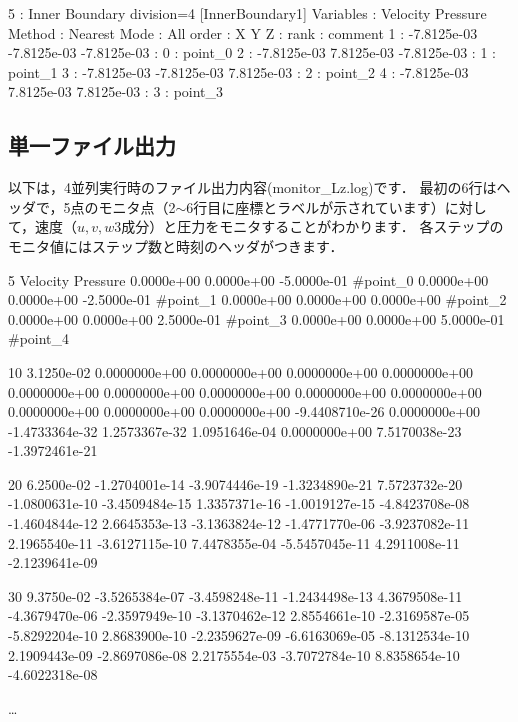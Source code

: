 {\begin{program}
  5 : Inner Boundary     division=4  [InnerBoundary1]
    Variables : Velocity Pressure 
       Method : Nearest
         Mode : All
        order :            X            Y            Z  :   rank : comment
            1 :  -7.8125e-03  -7.8125e-03  -7.8125e-03  :      0 : point_0
            2 :  -7.8125e-03   7.8125e-03  -7.8125e-03  :      1 : point_1
            3 :  -7.8125e-03  -7.8125e-03   7.8125e-03  :      2 : point_2
            4 :  -7.8125e-03   7.8125e-03   7.8125e-03  :      3 : point_3
\end{program}
}

\subsection{単一ファイル出力}
以下は，4並列実行時のファイル出力内容(monitor\_Lz.log)です．
最初の6行はヘッダで，5点のモニタ点（2$\sim$6行目に座標とラベルが示されています）に対して，速度（$u,v,w$3成分）と圧力をモニタすることがわかります．
各ステップのモニタ値にはステップ数と時刻のヘッダがつきます．

{\small
\begin{program}
5 Velocity Pressure 
  0.0000e+00   0.0000e+00  -5.0000e-01  #point_0
  0.0000e+00   0.0000e+00  -2.5000e-01  #point_1
  0.0000e+00   0.0000e+00   0.0000e+00  #point_2
  0.0000e+00   0.0000e+00   2.5000e-01  #point_3
  0.0000e+00   0.0000e+00   5.0000e-01  #point_4

10   3.1250e-02
  0.0000000e+00   0.0000000e+00   0.0000000e+00   0.0000000e+00 
  0.0000000e+00   0.0000000e+00   0.0000000e+00   0.0000000e+00 
  0.0000000e+00   0.0000000e+00   0.0000000e+00   0.0000000e+00 
 -9.4408710e-26   0.0000000e+00  -1.4733364e-32   1.2573367e-32 
  1.0951646e-04   0.0000000e+00   7.5170038e-23  -1.3972461e-21 

20   6.2500e-02
 -1.2704001e-14  -3.9074446e-19  -1.3234890e-21   7.5723732e-20 
 -1.0800631e-10  -3.4509484e-15   1.3357371e-16  -1.0019127e-15 
 -4.8423708e-08  -1.4604844e-12   2.6645353e-13  -3.1363824e-12 
 -1.4771770e-06  -3.9237082e-11   2.1965540e-11  -3.6127115e-10 
  7.4478355e-04  -5.5457045e-11   4.2911008e-11  -2.1239641e-09 

30   9.3750e-02
 -3.5265384e-07  -3.4598248e-11  -1.2434498e-13   4.3679508e-11 
 -4.3679470e-06  -2.3597949e-10  -3.1370462e-12   2.8554661e-10 
 -2.3169587e-05  -5.8292204e-10   2.8683900e-10  -2.2359627e-09 
 -6.6163069e-05  -8.1312534e-10   2.1909443e-09  -2.8697086e-08 
  2.2175554e-03  -3.7072784e-10   8.8358654e-10  -4.6022318e-08 

…
\end{program}
}

